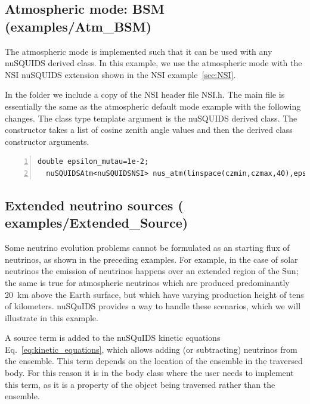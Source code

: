 \documentclass[3p,12pt]{elsarticle}
\newcommand{\ttf}{\ttfamily}
\begin{document}
\subsection{Atmospheric mode: BSM \textnormal{({\ttf examples/Atm\_BSM})}}
\label{sec:atmBSM}
The atmospheric mode is implemented such  that it can be used with any
{\ttf nuSQUIDS} derived class. In this example, we use the atmospheric mode
with the NSI {\ttf nuSQUIDS} extension shown in the NSI example~\ref{sec:NSI}.

In the folder we include a copy of the NSI header file {\ttf NSI.h}.
The main file is essentially the same as the atmospheric default mode
example with the following changes.
The class type template argument is the {\ttf nuSQUIDS} derived class. The
constructor takes a list of cosine zenith angle values and then the
derived class constructor arguments. 

\begin{lstlisting}[frame=leftline, numbers =
  left,breaklines=true,label = ex:sin1,firstnumber=last]
  double epsilon_mutau=1e-2;
  nuSQUIDSAtm<nuSQUIDSNSI> nus_atm(linspace(czmin,czmax,40),epsilon_mutau,logspace(Emin,Emax,100),numneu,both,true);
\end{lstlisting}

\subsection{Extended neutrino sources \textnormal{({\ttf
      examples/Extended\_Source})}}
\label{sec:extended_source}

Some neutrino evolution problems cannot be formulated as an starting flux
of neutrinos, as shown in the preceding examples.
For example, in the case of solar neutrinos the emission of neutrinos happens
over an extended region of the Sun; the same is true for atmospheric neutrinos
which are produced predominantly 20~km above the Earth surface, but which have varying production
height of tens of kilometers.
{\ttf nuSQuIDS} provides a way to handle these scenarios, which we will illustrate in this example.

A source term is added to the {\ttf nuSQuIDS} kinetic equations Eq.~\eqref{eq:kinetic_equations},
which allows adding (or subtracting) neutrinos from the ensemble.
This term depends on the location of the ensemble in the traversed body.
For this reason it is in the body class where the user needs to implement this term, as it is
a property of the object being traversed rather than the ensemble.
\end{document}
